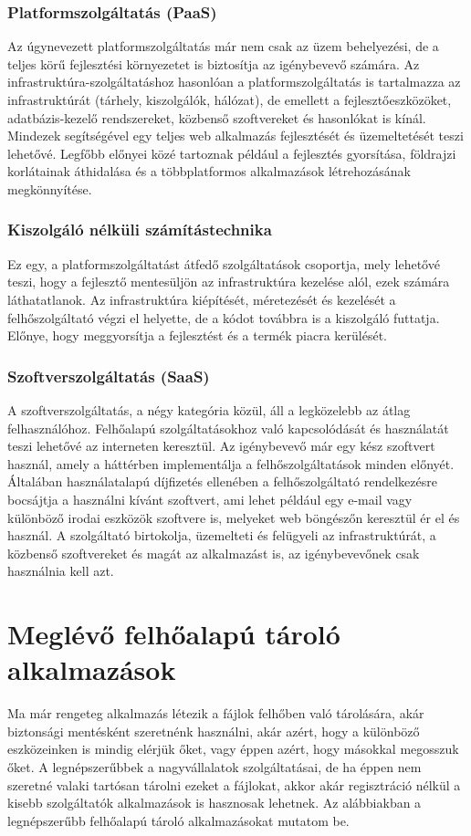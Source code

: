\documentclass[12pt]{report}
\begin{document}
\subsection{Platformszolgáltatás (PaaS)}
Az úgynevezett platformszolgáltatás már nem csak az üzem behelyezési, de a teljes körű fejlesztési környezetet is biztosítja az igénybevevő számára. Az infrastruktúra-szolgáltatáshoz hasonlóan a platformszolgáltatás is tartalmazza az infrastruktúrát (tárhely, kiszolgálók, hálózat), de emellett a fejlesztőeszközöket, adatbázis-kezelő rendszereket, közbenső szoftvereket és hasonlókat is kínál. Mindezek segítségével egy teljes web alkalmazás fejlesztését és üzemeltetését teszi lehetővé. Legfőbb előnyei közé tartoznak például a fejlesztés gyorsítása, földrajzi korlátainak áthidalása és a többplatformos alkalmazások létrehozásának megkönnyítése.
\subsection{Kiszolgáló nélküli számítástechnika}
Ez egy, a platformszolgáltatást átfedő szolgáltatások csoportja, mely lehetővé teszi, hogy a fejlesztő mentesüljön az infrastruktúra kezelése alól, ezek számára láthatatlanok. Az infrastruktúra kiépítését, méretezését és kezelését a felhőszolgáltató végzi el helyette, de a kódot továbbra is a kiszolgáló futtatja. Előnye, hogy meggyorsítja a fejlesztést és a termék piacra kerülését.
\subsection{Szoftverszolgáltatás (SaaS)}
A szoftverszolgáltatás, a négy kategória közül, áll a legközelebb az átlag felhasználóhoz. Felhőalapú szolgáltatásokhoz való kapcsolódását és használatát teszi lehetővé az interneten keresztül. Az igénybevevő már egy kész szoftvert használ, amely a háttérben implementálja a felhőszolgáltatások minden előnyét. Általában használatalapú díjfizetés ellenében a felhőszolgáltató rendelkezésre bocsájtja a használni kívánt szoftvert, ami lehet például egy e-mail vagy különböző irodai eszközök szoftvere is, melyeket web böngészőn keresztül ér el és használ. A szolgáltató birtokolja, üzemelteti és felügyeli az infrastruktúrát, a közbenső szoftvereket és magát az alkalmazást is, az igénybevevőnek csak használnia kell azt.


\chapter{Meglévő felhőalapú tároló alkalmazások}
Ma már rengeteg alkalmazás létezik a fájlok felhőben való tárolására, akár biztonsági mentésként szeretnénk használni, akár azért, hogy a különböző eszközeinken is mindig elérjük őket, vagy éppen azért, hogy másokkal megosszuk őket. A legnépszerűbbek a nagyvállalatok szolgáltatásai, de ha éppen nem szeretné valaki tartósan tárolni ezeket a fájlokat, akkor akár regisztráció nélkül a kisebb szolgáltatók alkalmazások is hasznosak lehetnek. Az alábbiakban a legnépszerűbb felhőalapú tároló alkalmazásokat mutatom be.
\end{document}
